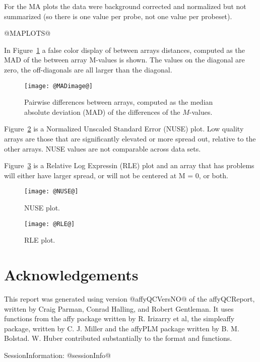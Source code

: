 \documentclass[11pt]{article}
\newcommand{\Rpackage}[1]{{\textsf{#1}}}
\begin{document}
For the MA plots the data were background corrected and normalized 
but not summarized (so there is one value per probe, not one value
per probeset). 

@MAPLOTS@

In Figure~\ref{fig:MADimage} a false color display of between arrays
distances, computed as the MAD of the between array M-values is shown.
The values on the diagonal are zero, the off-diagonals are all larger
than the diagonal.

\begin{figure}[tp]
  \centering
\texttt{[image: @MADimage@]}
\caption{\label{fig:MADimage}%
Pairwise differences between arrays, computed as the median absolute 
deviation (MAD) of the differences of the $M$-values.}
\end{figure}

Figure~\ref{fig:NUSE} is a Normalized Unscaled Standard Error (NUSE) 
plot.  Low quality arrays are those that are significantly elevated or 
more spread out, relative to the other arrays.
NUSE values are not comparable across data sets.

Figure~\ref{fig:RLE} is a Relative Log Expressin (RLE) plot
and an array that has problems will either have larger spread, or 
will not be centered at M = 0, or both.

\begin{figure}[tp]
  \centering
\texttt{[image: @NUSE@]}
\caption{\label{fig:NUSE}%
NUSE plot.}
\end{figure}

\begin{figure}[tp]
  \centering
\texttt{[image: @RLE@]}
\caption{\label{fig:RLE}%
RLE plot.}
\end{figure}

\section*{Acknowledgements}
\label{sec:ack}

This report was generated using version @affyQCVersNO@ of the 
\Rpackage{affyQCReport}, written by Craig Parman, Conrad Halling, and
Robert Gentleman. It uses functions from the \Rpackage{affy} package
written by R. Irizarry et al, the \Rpackage{simpleaffy} package, written
by C. J. Miller and the \Rpackage{affyPLM} package written by B. M. Bolstad.
W. Huber contributed substantially to the format and functions.

SessionInformation: 
@sessionInfo@
\end{document}
